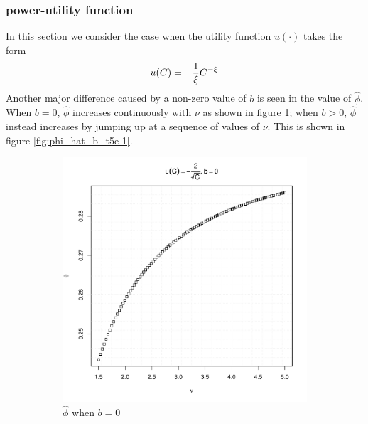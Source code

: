 \documentclass{article}
\newcommand{\1}[1]{
  \mathbf{1}_{\{#1\}}
}
\begin{document}
\subsubsection{power-utility function}
In this section we consider the case when the utility function
$u(\cdot)$ takes the form
\[
u(C) = -{1 \over \xi} C^{-\xi}
\]
Another major difference caused by a non-zero value of $b$ is seen in
the value of $\hat\phi$. When $b = 0$, $\hat\phi$ increases
continuously with $\nu$ as shown in figure \ref{fig:phi_hat_t5e-1};
when $b > 0$, $\hat\phi$ instead increases by jumping up at a sequence
of values of $\nu$. This is shown in figure \ref{fig:phi_hat_b_t5e-1}.
\begin{figure}[htb!]
  \begin{subfigure}[b]{0.5\linewidth}
    \includegraphics[width=\textwidth]{phi_hat_t5e-1.pdf}
    \caption{$\hat\phi$ when $b = 0$}
    \label{fig:phi_hat_t5e-1}
  \end{subfigure}
  \begin{subfigure}[b]{0.5\linewidth}

\end{subfigure}
\end{figure}
\end{document}
